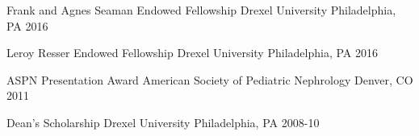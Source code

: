\begin{cvhonors}
  \cvhonor
    {Frank and Agnes Seaman Endowed Fellowship} %
    {Drexel University} %
    {Philadelphia, PA} %
    {2016} %
    
  \cvhonor
    {Leroy Resser Endowed Fellowship} %
    {Drexel University} %
    {Philadelphia, PA} %
    {2016} %
    
  \cvhonor
    {ASPN Presentation Award} %
    {American Society of Pediatric Nephrology} %
    {Denver, CO} %
    {2011} %

  \cvhonor
    {Dean's Scholarship} %
    {Drexel University} %
    {Philadelphia, PA} %
    {2008-10} %
\end{cvhonors}

